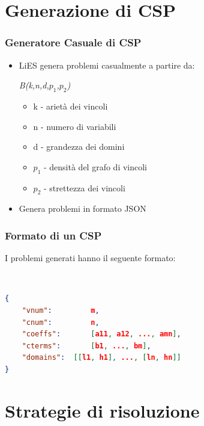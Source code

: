 \documentclass{beamer}
\begin{document}
\section{Generazione di CSP}

\begin{frame}
\frametitle{Generatore Casuale di CSP}

\begin{itemize}
	\item LiES genera problemi casualmente a partire da:
\begin{center}
	\textit{B(k,n,d,$p_1$,$p_2$)}
\end{center}
	\begin{itemize}
		\item k - arietà dei vincoli
		\item n - numero di variabili
		\item d - grandezza dei domini
		\item $p_1$ - densità del grafo di vincoli
		\item $p_2$ - strettezza dei vincoli
	\end{itemize}
	\item Genera problemi in formato JSON
\end{itemize}

\end{frame}

\begin{frame}[fragile]
\frametitle{Formato di un CSP}
I problemi generati hanno il seguente formato:

\hspace{1cm}~\begin{minipage}[c]{.9\textwidth}
\begin{lstlisting}[language=json]
{
	"vnum": 		m,
	"cnum":			n,
	"coeffs":		[a11, a12, ..., amn],
	"cterms":		[b1, ..., bm],
	"domains":	[[l1, h1], ..., [ln, hn]]
}
\end{lstlisting}
\end{minipage}
\end{frame}

\section{Strategie di risoluzione}
\end{document}
